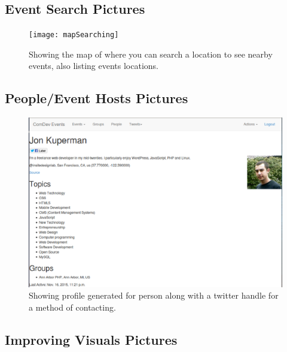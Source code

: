 \documentclass[draftclsnofoot,10pt,onecolumn]{IEEEtran} %
\begin{document}
\subsection{Event Search Pictures}

\begin{figure}[H]
  \begin{center}
  
  \texttt{[image: mapSearching]}
  \captionsetup{width=.4\linewidth}
  \centering
  \caption{Showing the map of where you can search a location to see nearby events, also listing events locations. }

  \end{center}
\end{figure}

\subsection{People/Event Hosts Pictures}

\begin{figure}[H]
  \begin{center}
  
  \includegraphics[width=6in, frame]{peopleProfile}
  \captionsetup{width=.4\linewidth}
  \centering
  \caption{Showing profile generated for person along with a twitter handle for a method of contacting. }

  \end{center}
\end{figure}

\subsection{Improving Visuals Pictures}
\end{document}

